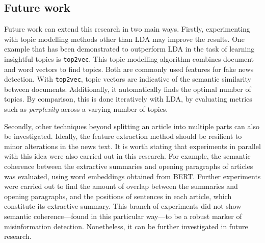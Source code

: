 \subsection{Future work}
\label{ssec:4-future-work}

Future work can extend this research in two main ways. Firstly, experimenting with topic modelling methods other than \ac{LDA} may improve the results. One example that has been demonstrated to outperform \ac{LDA} in the task of learning insightful topics is \texttt{top2vec}. This topic modelling algorithm combines document and word vectors to find topics. Both are commonly used features for fake news detection. With \texttt{top2vec}, topic vectors are indicative of the semantic similarity between documents. Additionally, it automatically finds the optimal number of topics. By comparison, this is done iteratively with \ac{LDA}, by evaluating metrics such as \emph{perplexity} across a varying number of topics.

Secondly, other techniques beyond splitting an article into multiple parts can also be investigated. Ideally, the feature extraction method should be resilient to minor alterations in the news text. It is worth stating that experiments in parallel with this idea were also carried out in this research. For example, the semantic coherence between the extractive summaries and opening paragraphs of articles was evaluated, using word embeddings obtained from \ac{BERT}. Further experiments were carried out to find the amount of overlap between the summaries and opening paragraphs, and the positions of sentences in each article, which constitute its extractive summary. This branch of experiments did not show semantic coherence—found in this particular way—to be a robust marker of misinformation detection. Nonetheless, it can be further investigated in future research.

